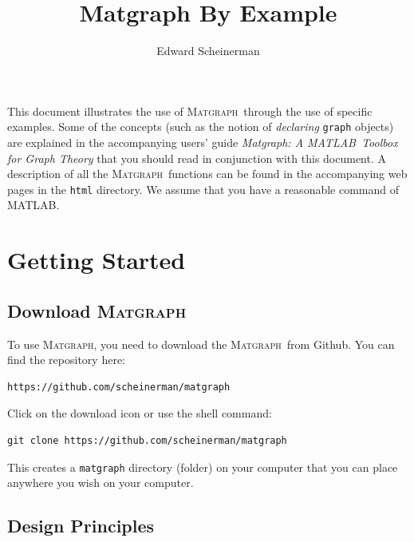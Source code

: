 \documentclass[12pt]{amsart}
\title{Matgraph By Example}
\author{Edward Scheinerman}
\date{\superdate}
\newcommand\matlab{MATLAB}
\newcommand\matgraph{\textsc{Matgraph}}
\begin{document}
\maketitle


This document illustrates the use of \matgraph\ through the use of
specific examples. Some of the concepts (such as the notion of
\emph{declaring} \verb|graph| objects) are explained in the
accompanying users' guide \emph{Matgraph: A \matlab\ Toolbox for Graph
  Theory} that you should read in conjunction with this document. A
description of all the \matgraph\ functions can be found in the
accompanying web pages in the \verb|html| directory.  We assume that
you have a reasonable command of \matlab.

\section{Getting Started}


\subsection{Download \matgraph}
\label{sect:download}
To use \matgraph, you need to download the \matgraph\ 
from Github. You can find the repository here:
\begin{verbatim}
https://github.com/scheinerman/matgraph
\end{verbatim}
Click on the download icon or use the shell command:
\begin{verbatim}
git clone https://github.com/scheinerman/matgraph
\end{verbatim}
This creates a \verb|matgraph| directory (folder) on your computer
that you can place anywhere you wish on your computer.


\subsection{Design Principles}
\end{document}
